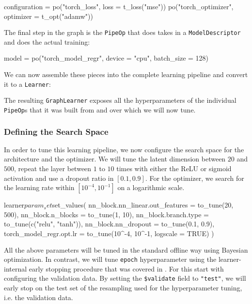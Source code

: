 \documentclass[article, nojss]{jss}
\theoremstyle{definition}
\begin{document}
\begin{CodeInput}
configuration = po("torch_loss", loss = t_loss("mse")) %
  po("torch_optimizer", optimizer = t_opt("adamw"))
\end{CodeInput}

The final step in the graph is the \texttt{PipeOp} that does takes in a \texttt{ModelDescriptor} and does the actual training:

\begin{CodeInput}
model = po("torch_model_regr", device = "cpu", batch_size = 128)
\end{CodeInput}

We can now assemble these pieces into the complete learning pipeline and convert it to a \texttt{Learner}:


The resulting \texttt{GraphLearner} exposes all the hyperparameters of the individual \texttt{PipeOp}s that it was built from and over which we will now tune.

\subsubsection{Defining the Search Space}
In order to tune this learning pipeline, we now configure the search space for the architecture and the optimizer.
We will tune the latent dimension between $20$ and $500$, repeat the layer between $1$ to $10$ times with either the ReLU or sigmoid activation and use a dropout ratio in $[0.1, 0.9]$.
For the optimizer, we search for the learning rate within $[10^{-4}, 10^{-1}]$ on a logarithmic scale.

\begin{CodeInput}
learner$param_set$set_values(
  nn_block.nn_linear.out_features = to_tune(20, 500),
  nn_block.n_blocks = to_tune(1, 10),
  nn_block.branch.type = to_tune(c("relu", "tanh")),
  nn_block.nn_dropout = to_tune(0.1, 0.9),
  torch_model_regr.opt.lr = to_tune(10^-4, 10^-1, logscale = TRUE)
)
\end{CodeInput}

All the above parameters will be tuned in the standard offline way using Bayesian optimization.
In contrast, we will tune  \texttt{epoch} hyperparameter using the learner-internal early stopping procedure that was covered in .
For this start with configuring the validation data.
By setting the \texttt{\$validate} field to \texttt{"test"}, we will early stop on the test set of the resampling used for the hyperparameter tuning, i.e. the validation data.
\end{document}
